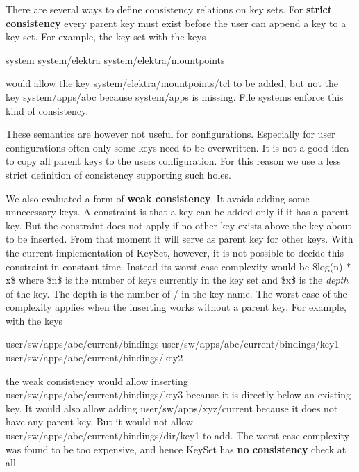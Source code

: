 There are several ways to define consistency relations on key sets. For {\bfseries strict consistency} every parent key must exist before the user can append a key to a key set. For example, the key set with the keys \begin{DoxyVerb}    system
    system/elektra
    system/elektra/mountpoints
\end{DoxyVerb}


would allow the key {\ttfamily system/elektra/mountpoints/tcl} to be added, but not the key {\ttfamily system/apps/abc} because {\ttfamily system/apps} is missing. File systems enforce this kind of consistency.

These semantics are however not useful for configurations. Especially for user configurations often only some keys need to be overwritten. It is not a good idea to copy all parent keys to the users configuration. For this reason we use a less strict definition of consistency supporting such holes.

We also evaluated a form of {\bfseries weak consistency}. It avoids adding some unnecessary keys. A constraint is that a key can be added only if it has a parent key. But the constraint does not apply if no other key exists above the key about to be inserted. From that moment it will serve as parent key for other keys. With the current implementation of {\ttfamily Key\+Set}, however, it is not possible to decide this constraint in constant time. Instead its worst-\/case complexity would be \$log(n) $\ast$ x\$ where \$n\$ is the number of keys currently in the key set and \$x\$ is the {\itshape depth} of the key. The depth is the number of {\ttfamily /} in the key name. The worst-\/case of the complexity applies when the inserting works without a parent key. For example, with the keys \begin{DoxyVerb}    user/sw/apps/abc/current/bindings
    user/sw/apps/abc/current/bindings/key1
    user/sw/apps/abc/current/bindings/key2
\end{DoxyVerb}


the weak consistency would allow inserting {\ttfamily user/sw/apps/abc/current/bindings/key3} because it is directly below an existing key. It would also allow adding {\ttfamily user/sw/apps/xyz/current} because it does not have any parent key. But it would not allow {\ttfamily user/sw/apps/abc/current/bindings/dir/key1} to add. The worst-\/case complexity was found to be too expensive, and hence {\ttfamily Key\+Set} has {\bfseries no consistency} check at all.

